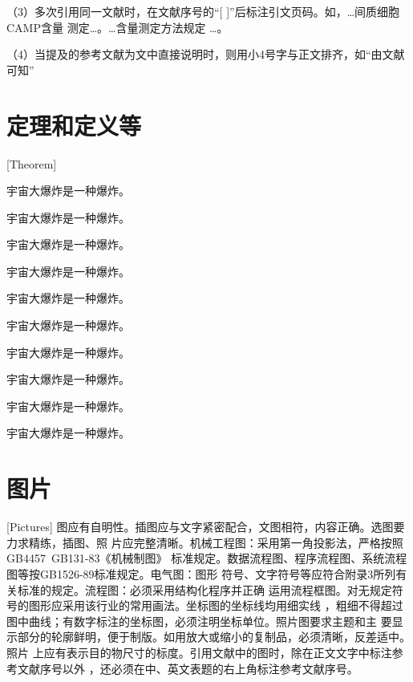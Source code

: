 （3）多次引用同一文献时，在文献序号的“[ ]”后标注引文页码。如，…间质细胞CAMP含量
测定\cite[100-197]{cnarticle}…。…含量测定方法规定
\cite[92]{cnarticle}…。

（4）当提及的参考文献为文中直接说明时，则用小4号字与正文排齐，如“由文献可知”

\section{定理和定义等}[Theorem]
\begin{theorem}
宇宙大爆炸是一种爆炸。
\end{theorem}
\begin{definition}[（霍金）]
宇宙大爆炸是一种爆炸。
\end{definition}
\begin{assumption}
宇宙大爆炸是一种爆炸。
\end{assumption}
\begin{lemma}
宇宙大爆炸是一种爆炸。
\end{lemma}
\begin{corollary}
宇宙大爆炸是一种爆炸。
\end{corollary}
\begin{exercise}
宇宙大爆炸是一种爆炸。
\end{exercise}
\begin{problem}
宇宙大爆炸是一种爆炸。
\end{problem}
\begin{remark}
宇宙大爆炸是一种爆炸。
\end{remark}
\begin{axiom}[（爱因斯坦）]
宇宙大爆炸是一种爆炸。
\end{axiom}
\begin{conjecture}
宇宙大爆炸是一种爆炸。
\end{conjecture}
\section{图片}[Pictures]
图应有自明性。插图应与文字紧密配合，文图相符，内容正确。选图要力求精练，插图、照
片应完整清晰。机械工程图：采用第一角投影法，严格按照GB4457~GB131-83《机械制图》
标准规定。数据流程图、程序流程图、系统流程图等按GB1526-89标准规定。电气图：图形
符号、文字符号等应符合附录3所列有关标准的规定。流程图：必须采用结构化程序并正确
运用流程框图。对无规定符号的图形应采用该行业的常用画法。坐标图的坐标线均用细实线
，粗细不得超过图中曲线；有数字标注的坐标图，必须注明坐标单位。照片图要求主题和主
要显示部分的轮廓鲜明，便于制版。如用放大或缩小的复制品，必须清晰，反差适中。照片
上应有表示目的物尺寸的标度。引用文献中的图时，除在正文文字中标注参考文献序号以外
，还必须在中、英文表题的右上角标注参考文献序号。

